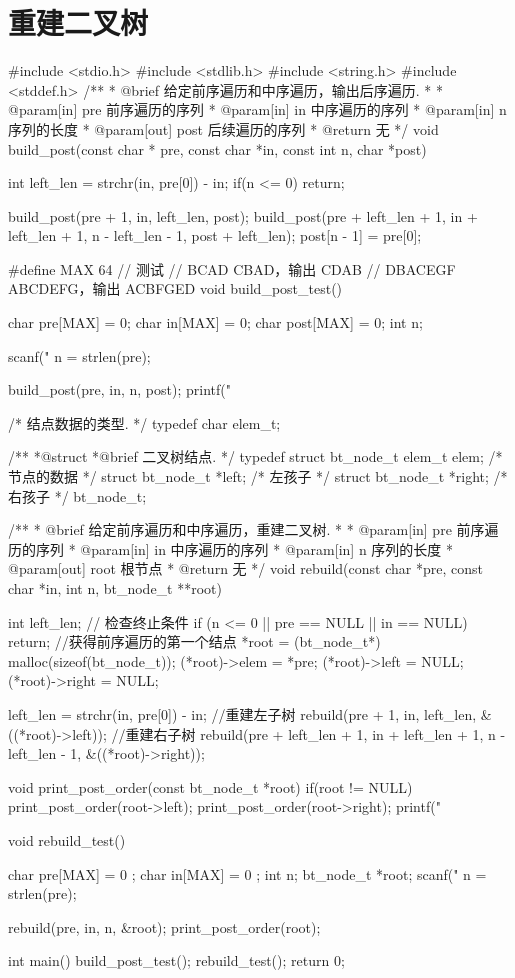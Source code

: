 \section{重建二叉树} %
\begin{Codex}[label=binary_tree_rebuild.c]
#include <stdio.h>
#include <stdlib.h>
#include <string.h>
#include <stddef.h>
/**
 * @brief 给定前序遍历和中序遍历，输出后序遍历.
 *
 * @param[in] pre 前序遍历的序列
 * @param[in] in 中序遍历的序列
 * @param[in] n 序列的长度
 * @param[out] post 后续遍历的序列
 * @return 无
 */
void build_post(const char * pre, const char *in, const int n, char *post) {
    int left_len = strchr(in, pre[0]) - in;
    if(n <= 0) return;
    
    build_post(pre + 1, in, left_len, post);
    build_post(pre + left_len + 1, in + left_len + 1,
            n - left_len - 1, post + left_len);
    post[n - 1] = pre[0];
}

#define MAX  64
// 测试
// BCAD CBAD，输出 CDAB
// DBACEGF ABCDEFG，输出 ACBFGED
void build_post_test() {
    char pre[MAX] = {0};
    char in[MAX] = {0};
    char post[MAX] = {0};
    int n;

    scanf("%
    n = strlen(pre);

    build_post(pre, in, n, post);
    printf("%
}

/* 结点数据的类型. */
typedef char elem_t;

/**
 *@struct
 *@brief 二叉树结点.
 */
typedef struct bt_node_t {
    elem_t elem; /* 节点的数据 */
    struct bt_node_t *left; /* 左孩子 */
    struct bt_node_t *right; /* 右孩子 */
} bt_node_t;

/**
 * @brief 给定前序遍历和中序遍历，重建二叉树.
 *
 * @param[in] pre 前序遍历的序列
 * @param[in] in 中序遍历的序列
 * @param[in] n 序列的长度
 * @param[out] root 根节点
 * @return 无
 */
void rebuild(const char *pre, const char *in, int n, bt_node_t **root) {
    int left_len;
    // 检查终止条件
    if (n <= 0 || pre == NULL || in == NULL)
        return;
    //获得前序遍历的第一个结点
    *root = (bt_node_t*) malloc(sizeof(bt_node_t));
    (*root)->elem = *pre;
    (*root)->left = NULL;
    (*root)->right = NULL;

    left_len = strchr(in, pre[0]) - in;
    //重建左子树
    rebuild(pre + 1, in, left_len, &((*root)->left));
    //重建右子树
    rebuild(pre + left_len + 1, in + left_len + 1, n - left_len - 1,
            &((*root)->right));
}

void print_post_order(const bt_node_t *root) {
    if(root != NULL) {
        print_post_order(root->left);
        print_post_order(root->right);
        printf("%
    }
}

void rebuild_test() {
    char pre[MAX] = { 0 };
    char in[MAX] = { 0 };
    int n;
    bt_node_t *root;
    scanf("%
    n = strlen(pre);
    
    rebuild(pre, in, n, &root);
    print_post_order(root);
}

int main() {
    build_post_test();
    rebuild_test();
    return 0;
}
\end{Codex}



